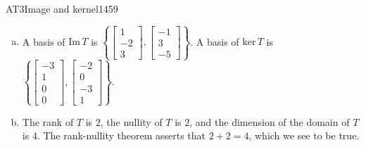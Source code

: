 \begin{exercise}{AT3}{Image and kernel}{1459}
\begin{exerciseAnswer}
\begin{enumerate}[(a)]
 
\item  

 A basis of \(\mathrm{Im}\,T\) is \(\left\{ \left[\begin{array}{c}
1 \\
-2 \\
3
\end{array}\right] , \left[\begin{array}{c}
-1 \\
3 \\
-5
\end{array}\right] \right\}\). A basis of \(\mathrm{ker}\,T\) is \(\left\{ \left[\begin{array}{c}
-3 \\
1 \\
0 \\
0
\end{array}\right] , \left[\begin{array}{c}
-2 \\
0 \\
-3 \\
1
\end{array}\right] \right\}\). 

 
\item  

 The rank of \(T\) is \(2\), the nullity of \(T\) is \(2\), and the dimension of the domain of \(T\) is \(4\). The rank-nullity theorem asserts that \(2+2=4\), which we see to be true. 

 
\end{enumerate}

     \end{exerciseAnswer}
 \end{exercise}


